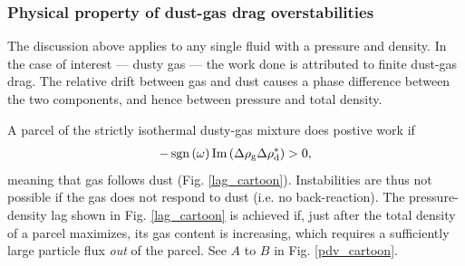 \subsubsection{Physical property of dust-gas drag overstabilities}  




The discussion above applies to any single fluid with a pressure and
density. In the case of interest --- dusty gas --- the work done 
is attributed to finite dust-gas drag. 
The relative 
drift between gas and dust causes a phase difference between the two
components, and hence between pressure and total density. 

A parcel of the strictly isothermal dusty-gas mixture does 
postive work if  
\begin{align*}
-\operatorname{sgn}\left(\omega\right)\operatorname{Im}\left(\Delta\rho_\mathrm{g}\Delta\rho_\mathrm{d}^*\right)>0,
\end{align*}
meaning that gas follows dust (Fig. \ref{lag_cartoon}). Instabilities
are thus not possible if the gas does not respond to dust 
(i.e. no back-reaction).%
The pressure-density lag shown in
Fig. \ref{lag_cartoon} is achieved if, just after the total density of a 
parcel maximizes, its gas content
is increasing, which requires a sufficiently large
particle flux \emph{out} of the parcel. See $A$ to $B$ in 
Fig. \ref{pdv_cartoon}. 


